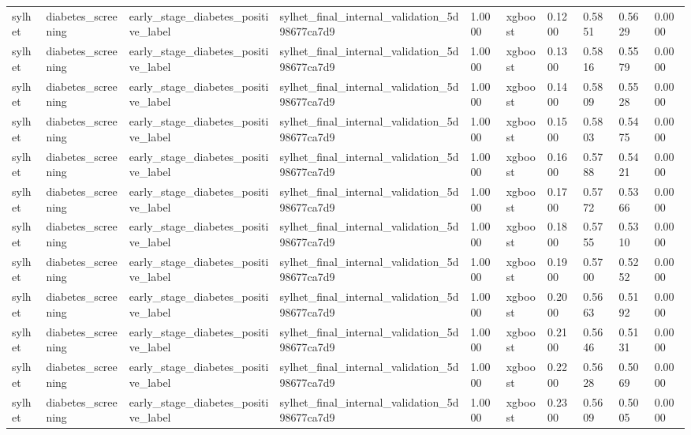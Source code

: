 \begin{tabular}{llllllllll}
sylhet & diabetes\_screening & early\_stage\_diabetes\_positive\_label & sylhet\_final\_internal\_validation\_5d98677ca7d9 & 1.0000 & xgboost & 0.1200 & 0.5851 & 0.5629 & 0.0000 \\
sylhet & diabetes\_screening & early\_stage\_diabetes\_positive\_label & sylhet\_final\_internal\_validation\_5d98677ca7d9 & 1.0000 & xgboost & 0.1300 & 0.5816 & 0.5579 & 0.0000 \\
sylhet & diabetes\_screening & early\_stage\_diabetes\_positive\_label & sylhet\_final\_internal\_validation\_5d98677ca7d9 & 1.0000 & xgboost & 0.1400 & 0.5809 & 0.5528 & 0.0000 \\
sylhet & diabetes\_screening & early\_stage\_diabetes\_positive\_label & sylhet\_final\_internal\_validation\_5d98677ca7d9 & 1.0000 & xgboost & 0.1500 & 0.5803 & 0.5475 & 0.0000 \\
sylhet & diabetes\_screening & early\_stage\_diabetes\_positive\_label & sylhet\_final\_internal\_validation\_5d98677ca7d9 & 1.0000 & xgboost & 0.1600 & 0.5788 & 0.5421 & 0.0000 \\
sylhet & diabetes\_screening & early\_stage\_diabetes\_positive\_label & sylhet\_final\_internal\_validation\_5d98677ca7d9 & 1.0000 & xgboost & 0.1700 & 0.5772 & 0.5366 & 0.0000 \\
sylhet & diabetes\_screening & early\_stage\_diabetes\_positive\_label & sylhet\_final\_internal\_validation\_5d98677ca7d9 & 1.0000 & xgboost & 0.1800 & 0.5755 & 0.5310 & 0.0000 \\
sylhet & diabetes\_screening & early\_stage\_diabetes\_positive\_label & sylhet\_final\_internal\_validation\_5d98677ca7d9 & 1.0000 & xgboost & 0.1900 & 0.5700 & 0.5252 & 0.0000 \\
sylhet & diabetes\_screening & early\_stage\_diabetes\_positive\_label & sylhet\_final\_internal\_validation\_5d98677ca7d9 & 1.0000 & xgboost & 0.2000 & 0.5663 & 0.5192 & 0.0000 \\
sylhet & diabetes\_screening & early\_stage\_diabetes\_positive\_label & sylhet\_final\_internal\_validation\_5d98677ca7d9 & 1.0000 & xgboost & 0.2100 & 0.5646 & 0.5131 & 0.0000 \\
sylhet & diabetes\_screening & early\_stage\_diabetes\_positive\_label & sylhet\_final\_internal\_validation\_5d98677ca7d9 & 1.0000 & xgboost & 0.2200 & 0.5628 & 0.5069 & 0.0000 \\
sylhet & diabetes\_screening & early\_stage\_diabetes\_positive\_label & sylhet\_final\_internal\_validation\_5d98677ca7d9 & 1.0000 & xgboost & 0.2300 & 0.5609 & 0.5005 & 0.0000 \\

\end{tabular}
